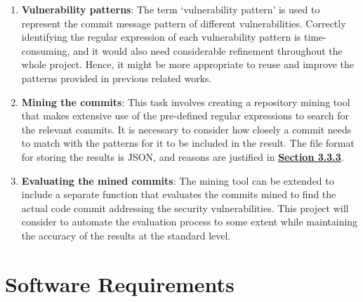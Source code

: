 \documentclass[12pt, a4paper]{report}
\begin{document}
\begin{enumerate}
	\item \textbf{Vulnerability patterns}: The term `vulnerability pattern' is used to represent the
  commit message pattern of different vulnerabilities. Correctly identifying the regular expression
  of each vulnerability pattern is time-consuming, and it would also need considerable refinement
  throughout the whole project. Hence, it might be more appropriate to reuse and improve the
  patterns provided in previous related works.
	\item \textbf{Mining the commits}: This task involves creating a repository mining tool that makes
	extensive use of the pre-defined regular expressions to search for the relevant commits. It is
	necessary to consider how closely a commit needs to match with the patterns for it to be included
	in the result. The file format for storing the results is JSON, and reasons are justified in \hyperref[subsec:file_format]{\textbf{Section 3.3.3}}.
	\item \textbf{Evaluating the mined commits}: The mining tool can be extended to include a separate
	function that evaluates the commits mined to find the actual code commit addressing the security
	vulnerabilities. This project will consider to automate the evaluation process to some extent
	while maintaining the accuracy of the results at the standard level.
\end{enumerate}

\section{Software Requirements}
\end{document}
